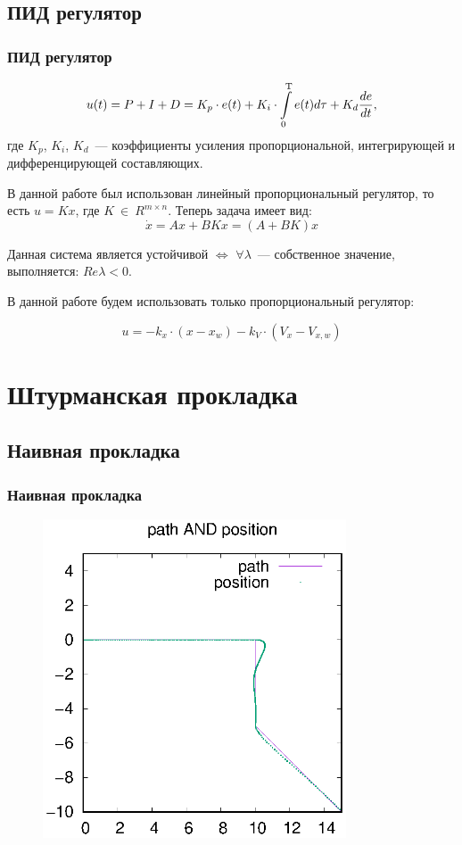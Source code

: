 \documentclass[10pt,t]{beamer}
\begin{document}
\subsection[ПИД регулятор]{ПИД регулятор}
\begin{frame}
\frametitle{ПИД регулятор}
\small

\begin{equation*}
    u(t) = P + I + D = K_p\cdot e(t) + K_i \cdot \int\limits_0^\text{\textup{T}} e(t) d\tau + K_d \frac{de}{dt},
\end{equation*} 
где $K_p$, $K_i$, $K_d$~--- коэффициенты усиления пропорциональной, интегрирующей и дифференцирующей составляющих.

В данной работе был использован линейный пропорциональный регулятор, то есть $u = Kx$, где $K~\in~R^{m\times n}$.
Теперь задача имеет вид:
\begin{equation*}\label{PID_lin}
    \Dot{x} = Ax + BKx = (A+BK)x
\end{equation*}

Данная система является устойчивой $\Longleftrightarrow$ $\forall \lambda$~--- собственное значение, выполняется: $Re\lambda < 0$.

В данной работе будем использовать только пропорциональный регулятор:

$$u = -k_x \cdot (x - x_w) - k_V\cdot (V_x - V_{x,w})$$
\end{frame}
\section[Штурманская прокладка]{Штурманская прокладка}
\subsection[Наивная прокладка]{Наивная прокладка}
\begin{frame}
\frametitle{Наивная прокладка}
\small

\pause

\begin{figure}[H]
\centering
\includegraphics[width=90mm]{default_path_not_procladka.eps}
\end{figure}

\end{frame}
\end{document}
